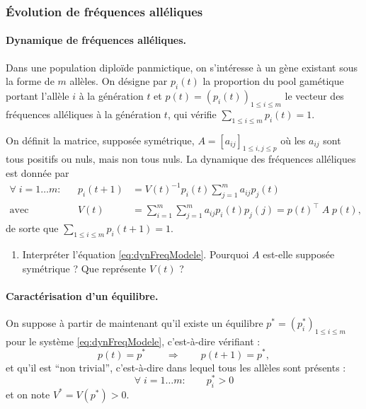 \subsubsection{\'Evolution de fréquences alléliques}

\paragraph{Dynamique de fréquences alléliques.}
Dans une population diploïde panmictique, on s’intéresse à un gène existant sous la forme de $m$ allèles. On désigne par $p_i(t)$ la proportion du pool gamétique portant l’allèle $i$  à la génération $t$ et $p(t) = (p_i(t))_{1 \leq i \leq m}$ le vecteur des fréquences alléliques à la génération $t$, qui vérifie $\sum_{1 \leq i \leq m}p_i(t) = 1$. 

On définit la matrice, supposée symétrique, $A = [a_{ij}]_{1 \leq i, j \leq p}$ où les $a_{ij}$ sont tous positifs ou nuls, mais non tous nuls. La dynamique des fréquences alléliques est donnée par
\begin{align} \label{eq:dynFreqModele}
  \forall \; i = 1 \dots m: & & 
  p_i(t+1) & = V(t)^{-1} p_i(t) \sum_{j=1}^m a_{ij} p_j(t) \\
  \text{avec} & & 
  V(t) & = \sum_{i=1}^m \sum_{j=1}^m a_{ij} p_i(t) p_j(j) = p(t)^\top \; A \; p(t), \nonumber
\end{align}
de sorte que $\sum_{1 \leq i \leq m} p_i(t+1) = 1$.

\bigskip
\begin{enumerate}
  \item Interpréter l'équation \eqref{eq:dynFreqModele}. Pourquoi $A$ est-elle supposée symétrique ? Que représente $V(t)$ ?
\end{enumerate}

\paragraph{Caractérisation d'un équilibre.}
On suppose à partir de maintenant qu'il existe un équilibre $p^* = (p^*_i)_{1 \leq i \leq m}$ pour le système \eqref{eq:dynFreqModele}, c'est-à-dire vérifiant : 
$$
p(t) = p^* \qquad \Rightarrow \qquad p(t+1) = p^*,
$$
et qu'il est ``non trivial'', c'est-à-dire dans lequel tous les allèles sont présents : 
$$
\forall \; i = 1 \dots m: \qquad p^*_i > 0
$$
et on note $V^* = V(p^*) > 0$.

